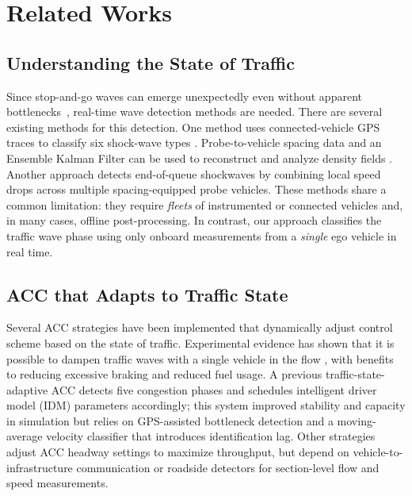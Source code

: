 \documentclass[conference]{IEEEtran}
\newcommand{\kibitz}[2]{\ifnum\Comments=1\textcolor{#1}{#2}\fi}
\newcommand{\jms}[1]{\kibitz{darkgreen}      {[JMS: #1]}}
\begin{document}
\section{Related Works}
\subsection{Understanding the State of Traffic}
Since stop-and-go waves can emerge unexpectedly even without apparent bottlenecks~\cite{Sugiyama2008}, real-time wave detection methods are needed. There are several existing methods for this detection.
One method uses connected-vehicle GPS traces to classify six shock-wave types \cite{futuretransp3040063}.
Probe-to-vehicle spacing data and an Ensemble Kalman Filter can be used to reconstruct and analyze density fields \cite{7313231}.
Another approach \cite{https://doi.org/10.1049/iet-its.2018.5124} detects end-of-queue shockwaves by combining local speed drops across multiple spacing-equipped probe vehicles. These methods share a common limitation: they require \emph{fleets} of instrumented or connected vehicles and, in many cases, offline post-processing. In contrast, our approach classifies the traffic wave phase using only onboard measurements from a \emph{single} ego vehicle in real time.

\subsection{ACC that Adapts to Traffic State}
Several ACC strategies have been implemented that dynamically adjust control scheme based on the state of traffic. 
Experimental evidence has shown that it is possible to dampen traffic waves with a single vehicle in the flow \cite{STERN2018205}, with benefits to reducing excessive braking and reduced fuel usage.
A previous traffic-state-adaptive ACC \cite{KESTING2008668} detects five congestion phases and schedules intelligent driver model (IDM) parameters accordingly; this system improved stability and capacity in simulation but relies on GPS-assisted bottleneck detection and a moving-average velocity classifier that introduces identification lag. Other strategies \cite{doi:10.1177/0361198118796020, doi:10.1177/03611981231152459} adjust ACC headway settings to maximize throughput, but depend on vehicle-to-infrastructure communication or roadside detectors for section-level flow and speed measurements.
\end{document}
